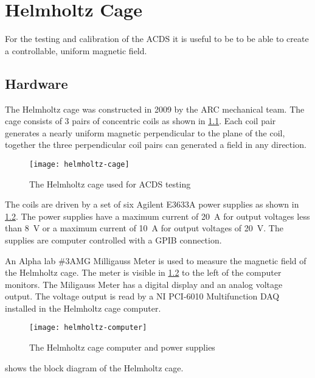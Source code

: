 

\chapter{Helmholtz Cage}

\label{ch:BG}

For the testing and calibration of the \ac{ACDS} it is useful to be to be able to create a controllable, uniform magnetic field.

\section{Hardware}

The Helmholtz cage was constructed in 2009 by the \ac{ARC} mechanical team. The cage consists of 3 pairs of concentric coils as shown in \cref{fig:helmholtz}. Each coil pair generates a nearly uniform magnetic perpendicular to the plane of the coil, together the three perpendicular coil pairs can generated a field in any direction.

\begin{figure}[!ht]
    \texttt{[image: helmholtz-cage]}
    \caption{The Helmholtz cage used for \acs{ACDS} testing}
    \label{fig:helmholtz}
\end{figure}

The coils are driven by a set of six Agilent E3633A power supplies as shown in \cref{fig:helmholtz-comp}. The power supplies have a maximum current of 20~A for output voltages less than 8~V or a maximum current of 10~A for output voltages of 20~V. The supplies are computer controlled with a \ac{GPIB} connection. 

An Alpha lab \#3AMG Milligauss Meter is used to measure the magnetic field of the Helmholtz cage. The meter is visible in \cref{fig:helmholtz-comp} to the left of the computer monitors. The Miligauss Meter has a digital display and an analog voltage output. The voltage output is read by a NI PCI-6010 Multifunction DAQ installed in the Helmholtz cage computer.

\begin{figure}[!ht]
    \texttt{[image: helmholtz-computer]}
    \caption{The Helmholtz cage computer and power supplies}
    \label{fig:helmholtz-comp}
\end{figure}

 shows the block diagram of the Helmholtz cage.

